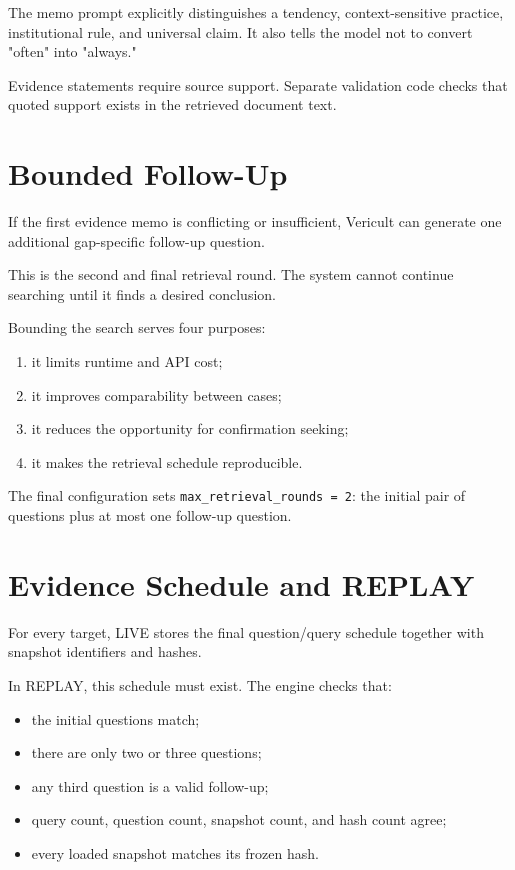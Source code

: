 The memo prompt explicitly distinguishes a tendency, context-sensitive practice, institutional rule, and universal claim. It also tells the model not to convert "often" into "always."

Evidence statements require source support. Separate validation code checks that quoted support exists in the retrieved document text.

\section{Bounded Follow-Up}

If the first evidence memo is conflicting or insufficient, Vericult can generate one additional gap-specific follow-up question.

This is the second and final retrieval round. The system cannot continue searching until it finds a desired conclusion.

Bounding the search serves four purposes:

\begin{enumerate}
\item it limits runtime and API cost;
\item it improves comparability between cases;
\item it reduces the opportunity for confirmation seeking;
\item it makes the retrieval schedule reproducible.
\end{enumerate}

The final configuration sets \texttt{max\_retrieval\_rounds = 2}: the initial pair of questions plus at most one follow-up question.

\section{Evidence Schedule and REPLAY}

For every target, LIVE stores the final question/query schedule together with snapshot identifiers and hashes.

In REPLAY, this schedule must exist. The engine checks that:

\begin{itemize}
\item the initial questions match;
\item there are only two or three questions;
\item any third question is a valid follow-up;
\item query count, question count, snapshot count, and hash count agree;
\item every loaded snapshot matches its frozen hash.
\end{itemize}

